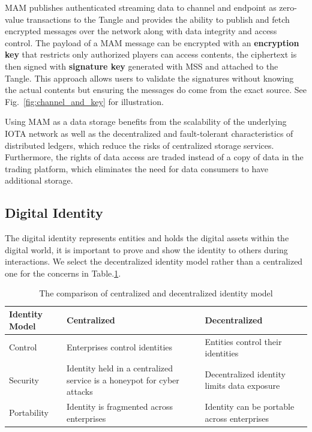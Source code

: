 \documentclass[conference]{IEEEtran}
\begin{document}
MAM publishes authenticated streaming data to channel and endpoint as zero-value transactions to the Tangle and provides the ability to publish and fetch encrypted messages over the network along with data integrity and access control. The payload of a MAM message can be encrypted with an \textbf{encryption key} that restricts only authorized players can access contents, the ciphertext is then signed with \textbf{signature key} generated with MSS and attached to the Tangle. This approach allows users to validate the signatures without knowing the actual contents but ensuring the messages do come from the exact source. See Fig.~\ref{fig:channel_and_key} for illustration.

Using MAM as a data storage benefits from the scalability of the underlying IOTA network as well as the decentralized and fault-tolerant characteristics of distributed ledgers, which reduce the risks of centralized storage services. Furthermore, the rights of data access are traded instead of a copy of data in the trading platform, which eliminates the need for data consumers to have additional storage.

\subsection{Digital Identity}
The digital identity represents entities and holds the digital assets within the digital world, it is important to prove and show the identity to others during interactions. We select the decentralized identity model rather than a centralized one for the concerns in Table.\ref{tab:did}.

\begin{table}[h]
    \caption{The comparison of centralized and decentralized identity model}
    \label{tab:did}
    \begin{tabularx}{\linewidth}{|l|X|X|}
    \hline
        \textbf{Identity Model} & \textbf{Centralized} & \textbf{Decentralized} \\
        \hline
        Control & Enterprises control identities & Entities control their identities \\
        \hline
        Security & Identity held in a centralized service is a honeypot for cyber attacks & Decentralized identity limits data exposure \\
        \hline
        Portability & Identity is fragmented across enterprises & Identity can be portable across enterprises \\
        \hline
    \end{tabularx}
\end{table}
\end{document}
